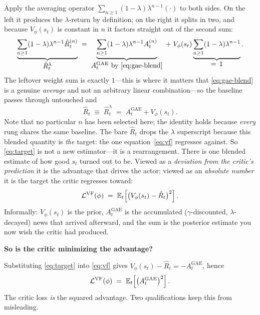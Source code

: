 Apply the averaging operator
$\sum_{n\ge1}(1-\lambda)\lambda^{n-1}(\cdot)$ to both sides. On the left it
produces the $\lambda$-return by definition; on the right it splits in two, and
because $V_{\phi}(s_{t})$ is constant in $n$ it factors straight out of the second sum:
%
\begin{equation}
  \underbrace{\sum_{n\ge1}(1-\lambda)\lambda^{n-1}\hat{R}^{(n)}_t}_{\textstyle \hat{R}^\lambda_t}
  \;=\; \underbrace{\sum_{n\ge1}(1-\lambda)\lambda^{n-1}A^{(n)}_t}_{\textstyle A^{\mathrm{GAE}}_t \ \text{by \eqref{eq:gae-blend}}}
  \;+\; V_{\phi}(s_{t})\underbrace{\sum_{n\ge1}(1-\lambda)\lambda^{n-1}}_{\textstyle =\,1}.
  \label{eq:blend-both-sides}
\end{equation}
%
The leftover weight sum is exactly $1$---this is where it matters that
\eqref{eq:gae-blend} is a genuine \emph{average} and not an arbitrary linear
combination---so the baseline passes through untouched and
%
\begin{equation}
  \boxed{\;\hat{R}_t \;\equiv\; \hat{R}^\lambda_t \;=\; A^{\mathrm{GAE}}_t + V_{\phi}(s_{t}).\;}
  \label{eq:target}
\end{equation}
%
Note that no particular $n$ has been selected here; the identity holds because
\emph{every} rung shares the same baseline. The bare $\hat{R}_t$ drops the $\lambda$ superscript
because this blended quantity is \emph{the} target: the one
equation~\eqref{eq:vf} regresses against. So \eqref{eq:target} is not a new estimator---it is a rearrangement. There is one
blended estimate of how good $s_t$ turned out to be. Viewed as a \emph{deviation
from the critic's prediction} it is the advantage that drives the actor; viewed as
an \emph{absolute number} it is the target the critic regresses toward:
%
\begin{equation}
  \mathcal{L}^{\mathrm{VF}}(\phi) \;=\; \mathbb{E}_t\!\left[\big(V_{\phi}(s_t) - \hat{R}_t\big)^2\right].
  \label{eq:vf}
\end{equation}
% 
Informally: $V_{\phi}(s_t)$ is the prior, $A^{\mathrm{GAE}}_t$ is the accumulated ($\gamma$-discounted,
$\lambda$-decayed) news that arrived afterward, and the sum is the posterior
estimate you now wish the critic had produced.
   
\textbf{So is the critic minimizing the advantage?}
 
Substituting \eqref{eq:target} into \eqref{eq:vf} gives
$V_{\phi}(s_t) - \hat{R}_t = -A^{\mathrm{GAE}}_t$, hence
%
\begin{equation}
  \mathcal{L}^{\mathrm{VF}}(\phi) \;=\; \mathbb{E}_t\!\left[\big(A^{\mathrm{GAE}}_t\big)^2\right].
  \label{eq:vf-as-adv}
\end{equation}
%
The critic loss \emph{is} the squared advantage. Two qualifications keep this from
misleading.
 
